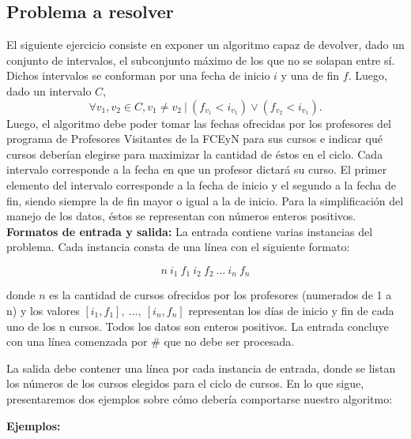 \subsection{Problema a resolver}
El siguiente ejercicio consiste en exponer un algoritmo capaz de devolver, dado un conjunto de intervalos, el subconjunto máximo de los que no se solapan entre sí. Dichos intervalos se conforman por una fecha de inicio $i$ y una de fin $f$. Luego, dado un intervalo $C$, $$\forall v_{1}, v_{2} \in C, v_{1} \neq v_{2}\ | \ (f_{v_{1}} < i_{v_{1}}) \vee (f_{v_{2}} < i_{v_{1}}).$$ Luego, el algoritmo debe poder tomar las fechas ofrecidas por los profesores del programa de Profesores Visitantes de la FCEyN para sus cursos e indicar qué cursos deberían elegirse para maximizar la cantidad de éstos en el ciclo. Cada intervalo corresponde a la fecha en que un profesor dictará su curso. El primer elemento del intervalo corresponde a la fecha de inicio y el segundo a la fecha de fin, siendo siempre la de fin mayor o igual a la de inicio. Para la simplificación del manejo de los datos, éstos se representan con números enteros positivos.\newline
\newline
\textbf {Formatos de entrada y salida:}\newline
\newline
La entrada contiene varias instancias del problema. Cada instancia consta de una línea con el siguiente formato:

$$n\ i_{1}\ f_{1}\ i_{2}\ f_{2}\ ...\ i_{n}\ f_{n}$$


donde \textbf{$n$} es la cantidad de cursos ofrecidos por los profesores (numerados de 1 a n) y los valores \textbf{$[i_{1},f_{1}],\ ...,\ [i_{n},f_{n}]$} representan los días de inicio y fin de cada uno de los n cursos. Todos los datos son enteros positivos. La entrada concluye con una línea comenzada por \# que no debe ser procesada.\newline

La salida debe contener una línea por cada instancia de entrada, donde se listan los números de los cursos elegidos para el ciclo de cursos.\newline
\newline
En lo que sigue, presentaremos dos ejemplos sobre cómo debería comportarse nuestro algoritmo:\newline

{\large{\textbf{Ejemplos:}}}\newline


